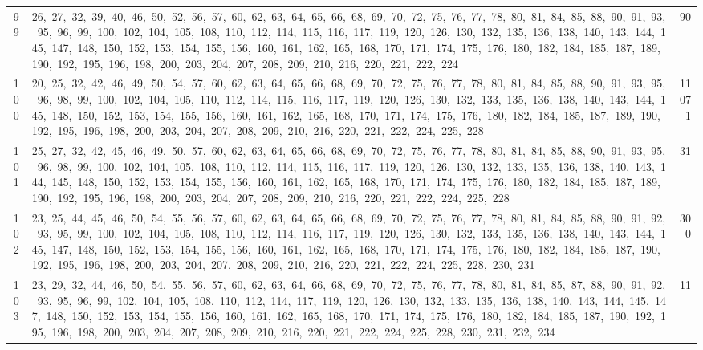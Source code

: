 \begin{longtable}{c|p{}|r}
99 & 26,\ 27,\ 32,\ 39,\ 40,\ 46,\ 50,\ 52,\ 56,\ 57,\ 60,\ 62,\ 63,\ 64,\ 65,\ 66,\ 68,\ 69,\ 70,\ 72,\ 75,\ 76,\ 77,\ 78,\ 80,\ 81,\ 84,\ 85,\ 88,\ 90,\ 91,\ 93,\ 95,\ 96,\ 99,\ 100,\ 102,\ 104,\ 105,\ 108,\ 110,\ 112,\ 114,\ 115,\ 116,\ 117,\ 119,\ 120,\ 126,\ 130,\ 132,\ 135,\ 136,\ 138,\ 140,\ 143,\ 144,\ 145,\ 147,\ 148,\ 150,\ 152,\ 153,\ 154,\ 155,\ 156,\ 160,\ 161,\ 162,\ 165,\ 168,\ 170,\ 171,\ 174,\ 175,\ 176,\ 180,\ 182,\ 184,\ 185,\ 187,\ 189,\ 190,\ 192,\ 195,\ 196,\ 198,\ 200,\ 203,\ 204,\ 207,\ 208,\ 209,\ 210,\ 216,\ 220,\ 221,\ 222,\ 224 & 90 \\
100 & 20,\ 25,\ 32,\ 42,\ 46,\ 49,\ 50,\ 54,\ 57,\ 60,\ 62,\ 63,\ 64,\ 65,\ 66,\ 68,\ 69,\ 70,\ 72,\ 75,\ 76,\ 77,\ 78,\ 80,\ 81,\ 84,\ 85,\ 88,\ 90,\ 91,\ 93,\ 95,\ 96,\ 98,\ 99,\ 100,\ 102,\ 104,\ 105,\ 110,\ 112,\ 114,\ 115,\ 116,\ 117,\ 119,\ 120,\ 126,\ 130,\ 132,\ 133,\ 135,\ 136,\ 138,\ 140,\ 143,\ 144,\ 145,\ 148,\ 150,\ 152,\ 153,\ 154,\ 155,\ 156,\ 160,\ 161,\ 162,\ 165,\ 168,\ 170,\ 171,\ 174,\ 175,\ 176,\ 180,\ 182,\ 184,\ 185,\ 187,\ 189,\ 190,\ 192,\ 195,\ 196,\ 198,\ 200,\ 203,\ 204,\ 207,\ 208,\ 209,\ 210,\ 216,\ 220,\ 221,\ 222,\ 224,\ 225,\ 228 & 11071 \\
101 & 25,\ 27,\ 32,\ 42,\ 45,\ 46,\ 49,\ 50,\ 57,\ 60,\ 62,\ 63,\ 64,\ 65,\ 66,\ 68,\ 69,\ 70,\ 72,\ 75,\ 76,\ 77,\ 78,\ 80,\ 81,\ 84,\ 85,\ 88,\ 90,\ 91,\ 93,\ 95,\ 96,\ 98,\ 99,\ 100,\ 102,\ 104,\ 105,\ 108,\ 110,\ 112,\ 114,\ 115,\ 116,\ 117,\ 119,\ 120,\ 126,\ 130,\ 132,\ 133,\ 135,\ 136,\ 138,\ 140,\ 143,\ 144,\ 145,\ 148,\ 150,\ 152,\ 153,\ 154,\ 155,\ 156,\ 160,\ 161,\ 162,\ 165,\ 168,\ 170,\ 171,\ 174,\ 175,\ 176,\ 180,\ 182,\ 184,\ 185,\ 187,\ 189,\ 190,\ 192,\ 195,\ 196,\ 198,\ 200,\ 203,\ 204,\ 207,\ 208,\ 209,\ 210,\ 216,\ 220,\ 221,\ 222,\ 224,\ 225,\ 228 & 31 \\
102 & 23,\ 25,\ 44,\ 45,\ 46,\ 50,\ 54,\ 55,\ 56,\ 57,\ 60,\ 62,\ 63,\ 64,\ 65,\ 66,\ 68,\ 69,\ 70,\ 72,\ 75,\ 76,\ 77,\ 78,\ 80,\ 81,\ 84,\ 85,\ 88,\ 90,\ 91,\ 92,\ 93,\ 95,\ 99,\ 100,\ 102,\ 104,\ 105,\ 108,\ 110,\ 112,\ 114,\ 116,\ 117,\ 119,\ 120,\ 126,\ 130,\ 132,\ 133,\ 135,\ 136,\ 138,\ 140,\ 143,\ 144,\ 145,\ 147,\ 148,\ 150,\ 152,\ 153,\ 154,\ 155,\ 156,\ 160,\ 161,\ 162,\ 165,\ 168,\ 170,\ 171,\ 174,\ 175,\ 176,\ 180,\ 182,\ 184,\ 185,\ 187,\ 190,\ 192,\ 195,\ 196,\ 198,\ 200,\ 203,\ 204,\ 207,\ 208,\ 209,\ 210,\ 216,\ 220,\ 221,\ 222,\ 224,\ 225,\ 228,\ 230,\ 231 & 300 \\
103 & 23,\ 29,\ 32,\ 44,\ 46,\ 50,\ 54,\ 55,\ 56,\ 57,\ 60,\ 62,\ 63,\ 64,\ 66,\ 68,\ 69,\ 70,\ 72,\ 75,\ 76,\ 77,\ 78,\ 80,\ 81,\ 84,\ 85,\ 87,\ 88,\ 90,\ 91,\ 92,\ 93,\ 95,\ 96,\ 99,\ 102,\ 104,\ 105,\ 108,\ 110,\ 112,\ 114,\ 117,\ 119,\ 120,\ 126,\ 130,\ 132,\ 133,\ 135,\ 136,\ 138,\ 140,\ 143,\ 144,\ 145,\ 147,\ 148,\ 150,\ 152,\ 153,\ 154,\ 155,\ 156,\ 160,\ 161,\ 162,\ 165,\ 168,\ 170,\ 171,\ 174,\ 175,\ 176,\ 180,\ 182,\ 184,\ 185,\ 187,\ 190,\ 192,\ 195,\ 196,\ 198,\ 200,\ 203,\ 204,\ 207,\ 208,\ 209,\ 210,\ 216,\ 220,\ 221,\ 222,\ 224,\ 225,\ 228,\ 230,\ 231,\ 232,\ 234 & 11 \\

\end{longtable}
